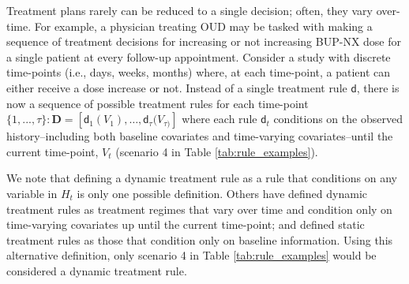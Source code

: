 \documentclass[11pt]{article}
\renewcommand{\d}{\mathsf{d}}
\theoremstyle{example}
\begin{document}
Treatment plans rarely can be reduced to a single decision; often, they vary over-time. For example, a physician treating OUD may be tasked with making a sequence of treatment decisions for increasing or not increasing BUP-NX dose for a single patient at every follow-up appointment. Consider a study with discrete time-points (i.e., days, weeks, months) where, at each time-point, a patient can either receive a dose increase or not. Instead of a single treatment rule $\d$, there is now a sequence of possible treatment rules for each time-point $\{1, ..., \tau\}: \mathbf{D} = [\d_1(V_1), \dots, \d_\tau(V_{\tau)}]$ where each rule $\d_t$ conditions on the observed history--including both baseline covariates and time-varying covariates--until the current time-point, $V_{t}$ (scenario 4 in Table \ref{tab:rule_examples}).

We note that defining a dynamic treatment rule as a rule that conditions on any variable in $H_{t}$ is only one possible definition. Others have defined dynamic treatment rules as treatment regimes that vary over time and condition only on time-varying covariates up until the current time-point; and defined static treatment rules as those that condition only on baseline information.\citep{cain2010start} Using this alternative definition, only scenario 4 in Table \ref{tab:rule_examples} would be considered a dynamic treatment rule.
\end{document}
